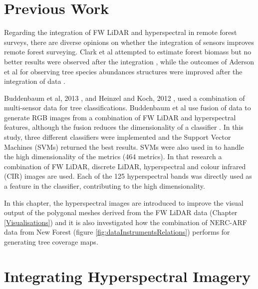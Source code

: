 \documentclass{subfiles}
\begin{document}
	\section{Previous Work}
	
	\par Regarding the integration of FW LiDAR and hyperspectral in remote forest surveys, there are diverse opinions on whether the integration of sensors improves remote forest surveying. Clark et al attempted to estimate forest biomass but no better results were observed after the integration \cite{Clark2011}, while the outcomes of Aderson et al for observing tree species abundances structures were improved after the integration of data \cite{Anderson2008}. 
	
	\par  Buddenbaum et al, 2013 \cite{Buddenbaum2013}, and Heinzel and Koch, 2012 \cite{Heinzel2012}, used a combination of multi-sensor data for tree classifications. Buddenbaum et al use fusion of data to generate RGB images from a combination of FW LiDAR and hyperspectral features, although the fusion reduces the dimensionality of a classifier \cite{Buddenbaum2013}. In this study, three different classifiers were implemented and the Support Vector Machines (SVMs) returned the best results. SVMs were also used in \cite{Heinzel2012} to handle the high dimensionality of the metrics (464 metrics). In that research a combination of FW LiDAR, discrete LiDAR, hyperspectral and colour infrared (CIR) images are used. Each of the 125 hyperspectral bands was directly used as a feature in the classifier, contributing to the high dimensionality. 
	
	\par In this chapter, the hyperspectral images are introduced to improve the visual output of the polygonal meshes derived from the FW LiDAR data (Chapter \ref{Visualisations}) and it is also investigated how the combination of NERC-ARF data from New Forest  (figure \ref{fig:dataInstrumentsRelations}) performs for generating tree coverage maps. 
	
	
	

	


	
\section{Integrating Hyperspectral Imagery}
\end{document}
